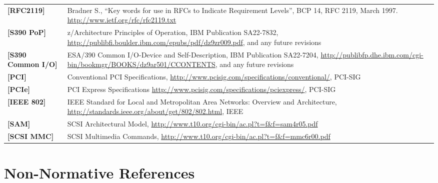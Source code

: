 \begin{longtable}{l p{5in}}
	\label{intro:rfc2119}\textbf{[RFC2119]} &
Bradner S., ``Key words for use in RFCs to Indicate Requirement
Levels'', BCP 14, RFC 2119, March 1997. \newline\url{http://www.ietf.org/rfc/rfc2119.txt}\\
	\label{intro:S390 PoP}\textbf{[S390 PoP]} & z/Architecture Principles of Operation, IBM Publication SA22-7832, \newline\url{http://publibfi.boulder.ibm.com/epubs/pdf/dz9zr009.pdf}, and any future revisions\\
	\label{intro:S390 Common I/O}\textbf{[S390 Common I/O]} & ESA/390 Common I/O-Device and Self-Description, IBM Publication SA22-7204, \newline\url{http://publibfp.dhe.ibm.com/cgi-bin/bookmgr/BOOKS/dz9ar501/CCONTENTS}, and any future revisions\\
	\label{intro:PCI}\textbf{[PCI]} &
	Conventional PCI Specifications,
	\newline\url{http://www.pcisig.com/specifications/conventional/},
	PCI-SIG\\
	\label{intro:PCIe}\textbf{[PCIe]} &
	PCI Express Specifications
	\newline\url{http://www.pcisig.com/specifications/pciexpress/},
	PCI-SIG\\
	\label{intro:IEEE 802}\textbf{[IEEE 802]} &
	IEEE Standard for Local and Metropolitan Area Networks: Overview and Architecture,
	\newline\url{http://standards.ieee.org/about/get/802/802.html},
	IEEE\\
	\label{intro:SAM}\textbf{[SAM]} &
        SCSI Architectural Model,
        \newline\url{http://www.t10.org/cgi-bin/ac.pl?t=f&f=sam4r05.pdf}\\
	\label{intro:SCSI MMC}\textbf{[SCSI MMC]} &
        SCSI Multimedia Commands,
        \newline\url{http://www.t10.org/cgi-bin/ac.pl?t=f&f=mmc6r00.pdf}\\

\end{longtable}

\section{Non-Normative References}

